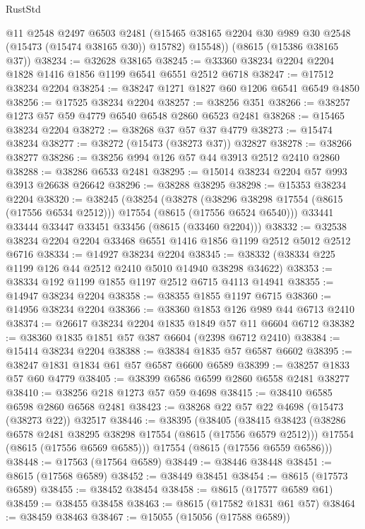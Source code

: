 \begin{lexlean}{RustStd}
\begin{coremodule}
        @11
        @2548
        @2497
        @6503
        @2481
        (@15465 @38165 @2204 @30 @989 @30 @2548 (@15473 (@15474 @38165 @30)) @15782)
        @15548))
    (@8615 (@15386 @38165 @37))
@38234 := @32628 @38165
@38245 := @33360 @38234 @2204 @2204 @1828 @1416 @1856 @1199 @6541 @6551 @2512 @6718
@38247 := @17512 @38234 @2204
@38254 := @38247 @1271 @1827 @60 @1206 @6541 @6549 @4850
@38256 := @17525 @38234 @2204
@38257 := @38256 @351
@38266 := @38257 @1273 @57 @59 @4779 @6540 @6548 @2860 @6523 @2481
@38268 := @15465 @38234 @2204
@38272 := @38268 @37 @57 @37 @4779
@38273 := @15474 @38234
@38277 := @38272 (@15473 (@38273 @37)) @32827
@38278 := @38266 @38277
@38286 := @38256 @994 @126 @57 @44 @3913 @2512 @2410 @2860
@38288 := @38286 @6533 @2481
@38295 := @15014 @38234 @2204 @57 @993 @3913 @26638 @26642
@38296 := @38288 @38295
@38298 := @15353 @38234 @2204
@38320 := @38245
    (@38254
      (@38278
        (@38296 @38298 @17554 (@8615 (@17556 @6534 @2512)))
        @17554
        (@8615 (@17556 @6524 @6540)))
      @33441
      @33444
      @33447
      @33451
      @33456
      (@8615 (@33460 @2204)))
@38332 := @32538 @38234 @2204 @2204 @33468 @6551 @1416 @1856 @1199 @2512 @5012 @2512 @6716
@38334 := @14927 @38234 @2204
@38345 := @38332 (@38334 @225 @1199 @126 @44 @2512 @2410 @5010 @14940 @38298 @34622)
@38353 := @38334 @192 @1199 @1855 @1197 @2512 @6715 @4113 @14941
@38355 := @14947 @38234 @2204
@38358 := @38355 @1855 @1197 @6715
@38360 := @14956 @38234 @2204
@38366 := @38360 @1853 @126 @989 @44 @6713 @2410
@38374 := @26617 @38234 @2204 @1835 @1849 @57 @11 @6604 @6712
@38382 := @38360 @1835 @1851 @57 @387 @6604 (@2398 @6712 @2410)
@38384 := @15414 @38234 @2204
@38388 := @38384 @1835 @57 @6587 @6602
@38395 := @38247 @1831 @1834 @61 @57 @6587 @6600 @6589
@38399 := @38257 @1833 @57 @60 @4779
@38405 := @38399 @6586 @6599 @2860 @6558 @2481 @38277
@38410 := @38256 @218 @1273 @57 @59 @4698
@38415 := @38410 @6585 @6598 @2860 @6568 @2481
@38423 := @38268 @22 @57 @22 @4698 (@15473 (@38273 @22)) @32517
@38446 := @38395
    (@38405
      (@38415
        @38423
        (@38286 @6578 @2481 @38295 @38298 @17554 (@8615 (@17556 @6579 @2512)))
        @17554
        (@8615 (@17556 @6569 @6585)))
      @17554
      (@8615 (@17556 @6559 @6586)))
@38448 := @17563 (@17564 @6589)
@38449 := @38446 @38448
@38451 := @8615 (@17568 @6589)
@38452 := @38449 @38451
@38454 := @8615 (@17573 @6589)
@38455 := @38452 @38454
@38458 := @8615 (@17577 @6589 @61)
@38459 := @38455 @38458
@38463 := @8615 (@17582 @1831 @61 @57)
@38464 := @38459 @38463
@38467 := @15055 (@15056 (@17588 @6589))

\end{coremodule}
\end{lexlean}
